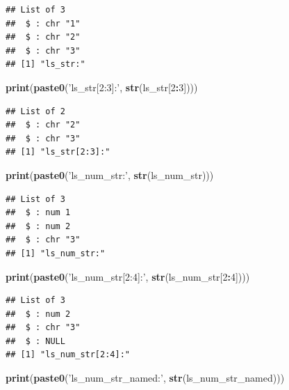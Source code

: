 \documentclass[
]{book}
\newenvironment{Shaded}{\begin{snugshade}}{\end{snugshade}}
\newcommand{\DecValTok}[1]{\textcolor[rgb]{0.00,0.00,0.81}{#1}}
\newcommand{\KeywordTok}[1]{\textcolor[rgb]{0.13,0.29,0.53}{\textbf{#1}}}
\newcommand{\NormalTok}[1]{#1}
\newcommand{\OperatorTok}[1]{\textcolor[rgb]{0.81,0.36,0.00}{\textbf{#1}}}
\newcommand{\StringTok}[1]{\textcolor[rgb]{0.31,0.60,0.02}{#1}}
\begin{document}
\begin{verbatim}
## List of 3
##  $ : chr "1"
##  $ : chr "2"
##  $ : chr "3"
## [1] "ls_str:"
\end{verbatim}

\begin{Shaded}
\begin{Highlighting}[]
\KeywordTok{print}\NormalTok{(}\KeywordTok{paste0}\NormalTok{(}\StringTok{'ls_str[2:3]:'}\NormalTok{, }\KeywordTok{str}\NormalTok{(ls_str[}\DecValTok{2}\OperatorTok{:}\DecValTok{3}\NormalTok{])))}
\end{Highlighting}
\end{Shaded}

\begin{verbatim}
## List of 2
##  $ : chr "2"
##  $ : chr "3"
## [1] "ls_str[2:3]:"
\end{verbatim}

\begin{Shaded}
\begin{Highlighting}[]
\KeywordTok{print}\NormalTok{(}\KeywordTok{paste0}\NormalTok{(}\StringTok{'ls_num_str:'}\NormalTok{, }\KeywordTok{str}\NormalTok{(ls_num_str)))}
\end{Highlighting}
\end{Shaded}

\begin{verbatim}
## List of 3
##  $ : num 1
##  $ : num 2
##  $ : chr "3"
## [1] "ls_num_str:"
\end{verbatim}

\begin{Shaded}
\begin{Highlighting}[]
\KeywordTok{print}\NormalTok{(}\KeywordTok{paste0}\NormalTok{(}\StringTok{'ls_num_str[2:4]:'}\NormalTok{, }\KeywordTok{str}\NormalTok{(ls_num_str[}\DecValTok{2}\OperatorTok{:}\DecValTok{4}\NormalTok{])))}
\end{Highlighting}
\end{Shaded}

\begin{verbatim}
## List of 3
##  $ : num 2
##  $ : chr "3"
##  $ : NULL
## [1] "ls_num_str[2:4]:"
\end{verbatim}

\begin{Shaded}
\begin{Highlighting}[]
\KeywordTok{print}\NormalTok{(}\KeywordTok{paste0}\NormalTok{(}\StringTok{'ls_num_str_named:'}\NormalTok{, }\KeywordTok{str}\NormalTok{(ls_num_str_named)))}
\end{Highlighting}
\end{Shaded}
\end{document}
